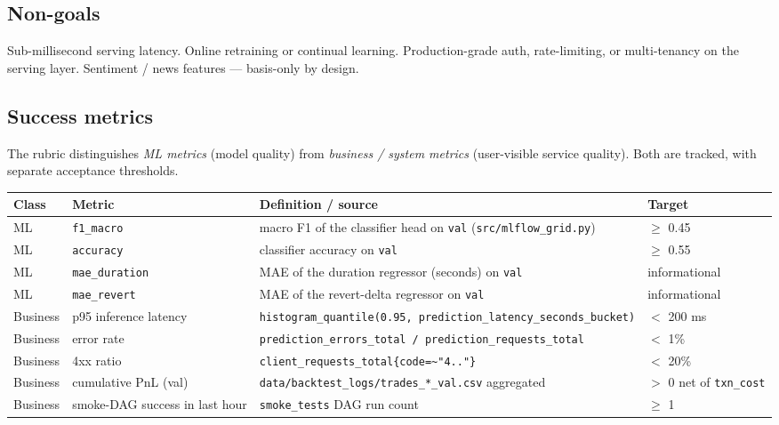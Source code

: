 \documentclass[11pt,a4paper]{article}
\begin{document}
\subsection{Non-goals}
Sub-millisecond serving latency. Online retraining or continual learning. Production-grade auth, rate-limiting, or multi-tenancy on the serving layer. Sentiment / news features --- basis-only by design.

\subsection{Success metrics}\label{sec:success-metrics}
The rubric distinguishes \emph{ML metrics} (model quality) from \emph{business / system metrics} (user-visible service quality). Both are tracked, with separate acceptance thresholds.

\begin{tabularx}{\linewidth}{@{}llXl@{}}
\toprule
\textbf{Class} & \textbf{Metric} & \textbf{Definition / source} & \textbf{Target} \\
\midrule
ML       & \texttt{f1\_macro}                & macro F1 of the classifier head on \texttt{val} (\texttt{src/mlflow\_grid.py})           & $\geq$ 0.45 \\
ML       & \texttt{accuracy}                 & classifier accuracy on \texttt{val}                                                       & $\geq$ 0.55 \\
ML       & \texttt{mae\_duration}            & MAE of the duration regressor (seconds) on \texttt{val}                                   & informational \\
ML       & \texttt{mae\_revert}              & MAE of the revert-delta regressor on \texttt{val}                                         & informational \\
Business & p95 inference latency             & \texttt{histogram\_quantile(0.95, prediction\_latency\_seconds\_bucket)}                  & $<$ 200 ms \\
Business & error rate                        & \texttt{prediction\_errors\_total / prediction\_requests\_total}                          & $<$ 1\% \\
Business & 4xx ratio                         & \texttt{client\_requests\_total\{code=\textasciitilde"4.."\}}                            & $<$ 20\% \\
Business & cumulative PnL (val)              & \texttt{data/backtest\_logs/trades\_*\_val.csv} aggregated                                & $>$ 0 net of \texttt{txn\_cost} \\
Business & smoke-DAG success in last hour    & \texttt{smoke\_tests} DAG run count                                                       & $\geq$ 1 \\
\bottomrule
\end{tabularx}
\end{document}

